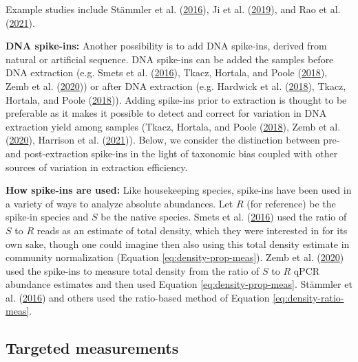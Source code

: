 \documentclass[
]{article}
\begin{document}
Example studies include Stämmler et al. (\protect\hyperlink{ref-stammler2016adju}{2016}), Ji et al. (\protect\hyperlink{ref-ji2019quan}{2019}), and Rao et al. (\protect\hyperlink{ref-rao2021mult}{2021}).

\textbf{DNA spike-ins:}
Another possibility is to add DNA spike-ins, derived from natural or artificial sequence.
DNA spike-ins can be added the samples before DNA extraction (e.g. Smets et al. (\protect\hyperlink{ref-smets2016amet}{2016}), Tkacz, Hortala, and Poole (\protect\hyperlink{ref-tkacz2018abso}{2018}), Zemb et al. (\protect\hyperlink{ref-zemb2020abso}{2020})) or after DNA extraction (e.g. Hardwick et al. (\protect\hyperlink{ref-hardwick2018synt}{2018}), Tkacz, Hortala, and Poole (\protect\hyperlink{ref-tkacz2018abso}{2018})).
Adding spike-ins prior to extraction is thought to be preferable as it makes it possible to detect and correct for variation in DNA extraction yield among samples
(Tkacz, Hortala, and Poole (\protect\hyperlink{ref-tkacz2018abso}{2018}), Zemb et al. (\protect\hyperlink{ref-zemb2020abso}{2020}), Harrison et al. (\protect\hyperlink{ref-harrison2021theq}{2021})).
Below, we consider the distinction between pre- and post-extraction spike-ins in the light of taxonomic bias coupled with other sources of variation in extraction efficiency.

\textbf{How spike-ins are used:}
Like housekeeping species, spike-ins have been used in a variety of ways to analyze absolute abundances.
Let \(R\) (for reference) be the spike-in species and \(S\) be the native species.
Smets et al. (\protect\hyperlink{ref-smets2016amet}{2016}) used the ratio of \(S\) to \(R\) reads as an estimate of total density, which they were interested in for its own sake, though one could imagine then also using this total density estimate in community normalization (Equation \eqref{eq:density-prop-meas}).
Zemb et al. (\protect\hyperlink{ref-zemb2020abso}{2020}) used the spike-ins to measure total density from the ratio of \(S\) to \(R\) qPCR abundance estimates and then used Equation \eqref{eq:density-prop-meas}.
Stämmler et al. (\protect\hyperlink{ref-stammler2016adju}{2016}) and others used the ratio-based method of Equation \eqref{eq:density-ratio-meas}.

\hypertarget{targeted-measurements}{%
\subsection{Targeted measurements}\label{targeted-measurements}}
\end{document}
